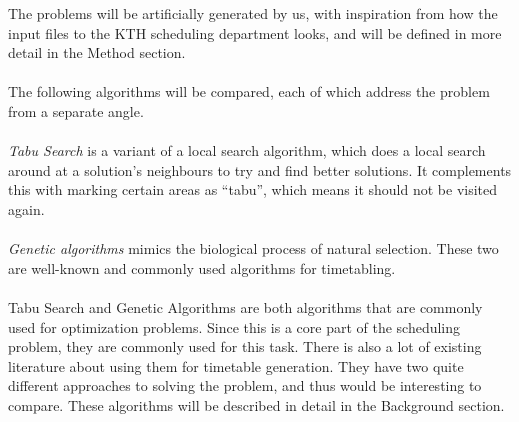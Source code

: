 \documentclass[titlepage,a4paper]{article}
\begin{document}
The problems will be artificially generated by us, with inspiration from how the input files to the KTH scheduling department looks, and will be defined in more detail in the Method section. \\\\
The following algorithms will be compared, each of which address the problem from a separate angle.\\\\
\emph{Tabu Search} is a variant of a local search algorithm, which does a local search around at a solution’s neighbours to try and find better solutions. It complements this with marking certain areas as “tabu”, which means it should not be visited again\cite{aTabuSearch07}. \\\\
\emph{Genetic algorithms} mimics the biological process of natural selection. These two are well-known and commonly used algorithms for timetabling\cite{guidedSearch09}. \\\\
Tabu Search and Genetic Algorithms are both algorithms that are commonly used for optimization problems. Since this is a core part of the scheduling problem, they are commonly used for this task. There is also a lot of existing literature about using them for timetable generation. They have two quite different approaches to solving the problem, and thus would be interesting to compare.
These algorithms will be described in detail in the Background section.

\pagebreak
\end{document}

